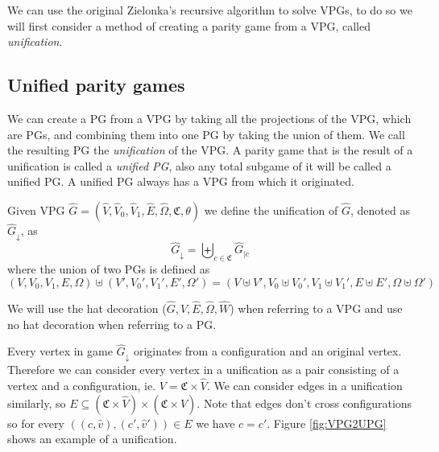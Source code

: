 We can use the original Zielonka's recursive algorithm to solve VPGs, to do so we will first consider a method of creating a parity game from a VPG, called \textit{unification}.
\subsection{Unified parity games}
We can create a PG from a VPG by taking all the projections of the VPG, which are PGs, and combining them into one PG by taking the union of them. We call the resulting PG the \textit{unification} of the VPG. A parity game that is the result of a unification is called a \textit{unified PG}, also any total subgame of it will be called a unified PG. A unified PG always has a VPG from which it originated.
\begin{definition}
	Given VPG $\hat{G} = (\hat{V},\hat{V}_0,\hat{V}_1, \hat{E},\hat{\Omega}, \mathfrak{C},\theta)$ we define the unification of $\hat{G}$, denoted as $\hat{G}_{\downarrow}$, as
	\[  \hat{G}_{\downarrow} = \biguplus_{c\in \mathfrak{C}}\hat{G}_{|c} \]
	where the union of two PGs is defined as
	\[ (V,V_0,V_1,E,\Omega) \uplus (V',V_0',V_1',E',\Omega') = (V \uplus V', V_0 \uplus V_0', V_1 \uplus V_1', E \uplus E', \Omega \uplus \Omega') \]
\end{definition}
We will use the hat decoration ($\hat{G},\hat{V},\hat{E},\hat{\Omega},\hat{W}$) when referring to a VPG and use no hat decoration when referring to a PG.

Every vertex in game $\hat{G}_{\downarrow}$ originates from a configuration and an original vertex. Therefore we can consider every vertex in a unification as a pair consisting of a vertex and a configuration, ie. $V = \mathfrak{C} \times \hat{V}$. We can consider edges in a unification similarly, so $E \subseteq (\mathfrak{C} \times \hat{V}) \times (\mathfrak{C} \times \hat{V})$. Note that edges don't cross configurations so for every $((c,\hat{v}) , (c',\hat{v}')) \in E$ we have $c = c'$. Figure \ref{fig:VPG2UPG} shows an example of a unification.

